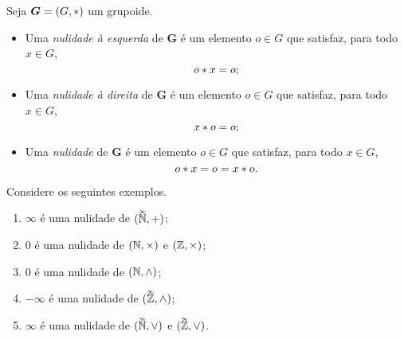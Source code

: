 \begin{definition}[Nulidade]
Seja $\bm G=(G,\ast)$ um grupoide.
	\begin{itemize}
	\item Uma \emph{nulidade à esquerda} de $\bm G$ é um elemento $o \in G$ que satisfaz, para todo $x \in G$,
		\begin{equation*}
		o \ast x = o;
		\end{equation*}
	\item Uma \emph{nulidade à direita} de $\bm G$ é um elemento $o \in G$ que satisfaz, para todo $x \in G$,
		\begin{equation*}
		x \ast o = o;
		\end{equation*}
	\item Uma \emph{nulidade} de $\bm G$ é um elemento $o \in G$ que satisfaz, para todo $x \in G$,
		\begin{equation*}
		o \ast x = o = x \ast o.
		\end{equation*}
	\end{itemize}
\end{definition}


\begin{example}
Considere os seguintes exemplos.
	\begin{enumerate}
	\item $\infty$ é uma nulidade de $(\accentset{\infty}{\mathbb{N}},+)$;%
	\item $0$ é uma nulidade de $(\mathbb{N},\times)$ e $(\mathbb{Z},\times)$;
	\item $0$ é uma nulidade de $(\mathbb{N},\mathbin{\wedge})$;
	\item $-\infty$ é uma nulidade de $(\accentset{\infty}{\mathbb{Z}},\mathbin{\wedge})$;
	\item $\infty$ é uma nulidade de $(\accentset{\infty}{\mathbb{N}},\mathbin{\vee})$ e $(\accentset{\infty}{\mathbb{Z}},\mathbin{\vee})$.
	\end{enumerate}
\end{example}

\begin{comment}
\begin{proposition}
\label{prop:unic.nulidade}
Seja $\bm G = (G,\opb)$ um grupoide. Se $\nulo$ é uma nulidade à esquerda e $\nulo'$ é uma nulidade à direita de $\bm G$, então $\nulo = \nulo'$ e $\nulo$ é a única nulidade de $\bm G$.
\end{proposition}
\begin{proof}
Como $\nulo'$ é nulidade à direita e $\nulo$ é nulidade à esquerda de $\bm G$, segue que
	\begin{equation*}
	\nulo = \nulo \opb \nulo' = \nulo'.
	\end{equation*}
A unicidade segue pois qualquer nulidade de $\bm G$ é nulidade à esquerda.
\end{proof}
\end{comment}

